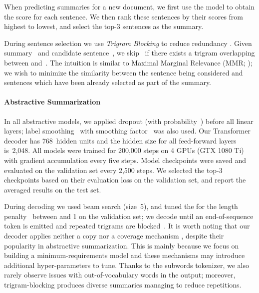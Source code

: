 \documentclass[11pt,a4paper]{article}
\begin{document}
    
    When predicting summaries for a new document, we first use the
    model to obtain the score for each sentence.  We then rank these
    sentences by their scores from highest to lowest, and select the
    top-3 sentences as the summary.
    
During sentence selection we use \textit{Trigram Blocking} to
    reduce redundancy \cite{paulus2017deep}.  Given summary~ and
    candidate sentence~, we skip~ if there exists a trigram
    overlapping between  and~. The intuition is similar to
    Maximal Marginal Relevance (MMR; \citealt{carbonell1998use}); we
    wish to minimize the similarity between the sentence being
    considered and sentences which have been already selected as part
    of the summary.
    
    \paragraph{Abstractive Summarization}
    In all abstractive models, we applied dropout (with
    probability~) before all linear layers; label
    smoothing~\citep{szegedy2016rethinking} with smoothing
    factor~ was also used.  Our Transformer decoder has
    768~hidden units and the hidden size for all feed-forward layers
    is~2,048.  All models were trained for 200,000 steps on 4 GPUs
    (GTX 1080 Ti) with gradient accumulation every five steps.  Model
    checkpoints were saved and evaluated on the validation set every
    2,500 steps. We selected the top-3 checkpoints based on their
    evaluation loss on the validation set, and report the averaged
    results on the test set.
    
    During decoding we used beam search (size~5), and tuned the
     for the length penalty~\citep{wu2016google} between 
    and 1 on the validation set; we decode until an end-of-sequence
    token is emitted and repeated trigrams are
    blocked~\cite{paulus2017deep}.  It is worth noting that our
    decoder applies neither a copy nor a coverage mechanism
    \cite{see-acl17}, despite their popularity in abstractive
    summarization. This is mainly because we focus on building a
    minimum-requirements model and these mechanisms may introduce
    additional hyper-parameters to tune.  Thanks to the subwords
    tokenizer, we also rarely observe issues with out-of-vocabulary
    words in the output; moreover, trigram-blocking produces diverse
    summaries managing to reduce repetitions. 
    
    
    
\end{document}
